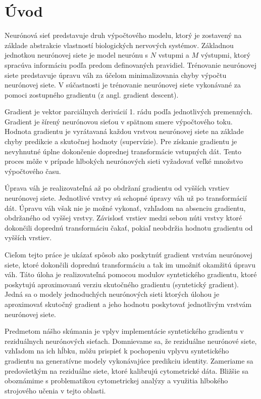 \chapter*{Úvod} %

Neurónová sieť predstavuje druh výpočtového modelu, ktorý je zostavený na základe abstrakcie vlastností biologických nervových systémov. Základnou jednotkou neurónovej siete je model neurónu s $N$ vstupmi a $M$ výstupmi, ktorý spracúva informáciu podľa predom definovaných pravidiel. Trénovanie neurónovej siete predstavuje úpravu váh za účelom minimalizovania chyby výpočtu neurónovej siete. V súčastnosti je trénovanie neurónovej siete vykonávané za pomoci zostupného gradientu (z angl. gradient descent). %

Gradient je vektor parciálnych derivácií 1. rádu podľa jednotlivých premenných. Gradient je šírený neurónovou sieťou v spätnom smere výpočtového toku. Hodnota gradientu je vyrátavaná každou vrstvou neurónovej siete na základe chyby predikcie a skutočnej hodnoty (supervízie). Pre získanie gradientu je nevyhnutné úplne dokončenie doprednej transformácie vstupných dát. Tento proces môže v prípade hlbokých neurónových sieti vyžadovať veľké množstvo výpočtového času. 

Úprava váh je realizovateľná až po obdržaní gradientu od vyšších vrstiev neurónovej siete. Jednotlivé vrstvy sú schopné úpravy váh už po transformácií dát. Úpravu váh však nie je možné vykonať, vzhľadom na absenciu gradientu, obdržaného od vyššej vrstvy. Závislosť vrstiev medzi sebou núti vrstvy ktoré dokončili doprednú transformáciu čakať, pokiaľ neobdržia hodnotu gradientu od vyšších vrstiev.

Cieľom tejto práce je ukázať spôsob ako poskytnúť gradient vrstvám neurónovej siete, ktoré dokončili
doprednú transformáciu a tak im umožniť okamžitú úpravu váh. Táto úloha je realizovateľná pomocou modulov syntetického gradientu, ktoré poskytujú aproximovanú verziu skutočného gradientu (syntetický gradient). Jedná sa o modely jednoduchých neurónových sieti ktorých úlohou je aproximovať skutočný gradient a jeho hodnotu poskytovať jednotlivým vrstvám neurónovej siete. 

Predmetom nášho skúmania je vplyv implementácie syntetického gradientu v reziduálnych neurónových sieťach. Domnievame sa, že reziduálne neurónové siete, vzhľadom na ich hĺbku, môžu prispieť k pochopeniu vplyvu syntetického gradientu na generatívne modely vykonávajúce predikciu identity. Zameriame sa predovšetkým na reziduálne siete, ktoré kalibrujú cytometrické dáta. Bližšie sa oboznámime s problematikou cytometrickej analýzy a využitia hlbokého strojového učenia v tejto oblasti.

